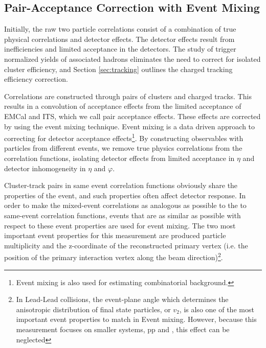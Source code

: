 \subsection{Pair-Acceptance Correction with Event Mixing}

\label{sec:EventMixing}
Initially, the raw two particle correlations consist of a combination of true physical correlations and detector effects. The detector effects result from inefficiencies and limited acceptance in the detectors. The study of trigger normalized yields of associated hadrons eliminates the need to correct for isolated cluster efficiency, and Section \ref{sec:tracking} outlines the charged tracking efficiency correction. %

Correlations are constructed through pairs of clusters and charged tracks. This results in a convolution of acceptance effects from the limited acceptance of EMCal and ITS, which we call pair acceptance effects. These effects are corrected by using the event mixing technique. Event mixing is a data driven approach to correcting for detector acceptance effects\footnote{Event mixing is also used for estimating combinatorial background.}. By constructing observables with particles from different events, we remove true physics correlations from the correlation functions, isolating detector effects from limited acceptance in \(\eta\) and detector inhomogeneity in $\eta$ and $\varphi$. 


Cluster-track pairs in same event correlation functions obviously share the properties of the event, and such properties often affect detector response. In order to make the mixed-event correlations as analogous as possible to the to same-event correlation functions, events that are as similar as possible with respect to these event properties are used for event mixing. The two most important event properties for this measurement are produced particle multiplicity and the z-coordinate of the reconstructed primary vertex (i.e. the position of the primary interaction vertex along the beam direction)\footnote{In Lead-Lead collisions, the event-plane angle which determines the anisotropic distribution of final state particles, or $v_{2}$, is also one of the most important event properties to match in Event mixing. However, because this measurement focuses on smaller systems, pp and \pPb, this effect can be neglected}. %



